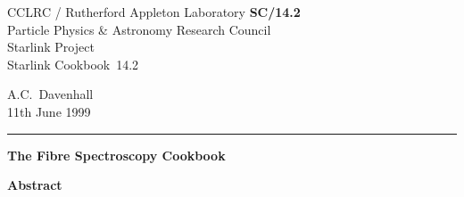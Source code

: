 \documentclass[twoside,11pt]{article}
\newcommand{\stardoccategory}  {Starlink Cookbook}
\newcommand{\stardocinitials}  {SC}
\newcommand{\stardocnumber}    {14.2}
\newcommand{\stardocauthors}   {A.C.~Davenhall}
\newcommand{\stardocdate}      {11th June 1999}
\newcommand{\stardoctitle}     {The Fibre Spectroscopy Cookbook}
\newcommand{\stardocname}{\stardocinitials /\stardocnumber}
\newenvironment{latexonly}{}{}
\begin{document}
\thispagestyle{empty}

\begin{latexonly}
   CCLRC / {\sc Rutherford Appleton Laboratory} \hfill {\bf \stardocname}\\
   {\large Particle Physics \& Astronomy Research Council}\\
   {\large Starlink Project\\}
   {\large \stardoccategory\ \stardocnumber}
   \begin{flushright}
   \stardocauthors\\
   \stardocdate
   \end{flushright}
   \vspace{-4mm}
   \rule{\textwidth}{0.5mm}
   \vspace{5mm}
   \begin{center}
   {\Huge\bf  \stardoctitle \\ [2.5ex]}
   \end{center}
   \vspace{5mm}


   \vspace{10mm}
   \begin{center}
      {\Large\bf Abstract}
   \end{center}
\end{latexonly}
\end{document}
